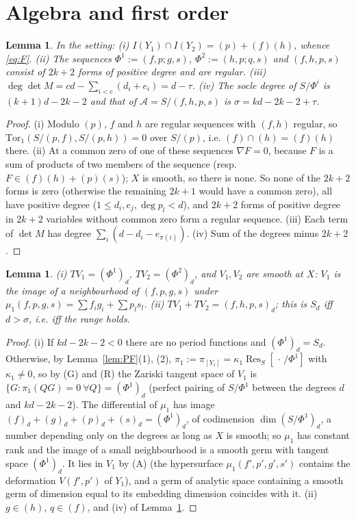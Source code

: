 \documentclass[11pt]{article}
\numberwithin{equation}{section}
\newtheorem{lemma}[theorem]{Lemma}
\theoremstyle{remark}
\newcommand{\cA}{\mathcal{A}}
\newcommand{\Res}{\operatorname{Res}}
\begin{document}
\section{Algebra and first order}\label{sec:first}

\begin{lemma}\label{lem:alg}
In the setting: (i) $I(Y_1)\cap I(Y_2)=(p)+(f)(h)$, whence \eqref{eq:F}. (ii) The sequences
$\Phi^1:=(f,p;g,s)$, $\Phi^2:=(h,p;q,s)$ and $(f,h,p,s)$ consist of $2k+2$ forms of positive degree and are
regular. (iii) $\deg\det M=cd-\sum_{i<c}(d_i+e_i)=d-\tau$. (iv) The socle degree of
$S/\Phi^i$ is $(k+1)d-2k-2$ and that of $\cA=S/(f,h,p,s)$ is $\sigma=kd-2k-2+\tau$.
\end{lemma}
\begin{proof}
(i) Modulo $(p)$, $f$ and $h$ are regular sequences with $(f,h)$ regular, so
$\mathrm{Tor}_1(S/(p,f),S/(p,h))=0$ over $S/(p)$, i.e. $(f)\cap(h)=(f)(h)$ there. (ii) At a common zero of one
of these sequences $\nabla F=0$, because $F$ is a sum of products of two members of the sequence (resp.
$F\in(f)(h)+(p)(s)$); $X$ is smooth, so there is none. So none of the $2k+2$ forms is zero (otherwise the
remaining $2k+1$ would have a common zero), all have positive degree ($1\le d_i,e_j,\deg p_l<d$), and $2k+2$
forms of positive degree in $2k+2$ variables without common zero form a regular sequence. (iii) Each term of
$\det M$ has degree $\sum_i(d-d_i-e_{\pi(i)})$. (iv) Sum of the degrees minus $2k+2$.
\end{proof}

\begin{lemma}\label{lem:T}
(i) $TV_1=(\Phi^1)_d$, $TV_2=(\Phi^2)_d$, and $V_1,V_2$ are smooth at $X$: $V_1$ is the image of a neighbourhood
of $(f,p,g,s)$ under $\mu_1(f,p,g,s)=\sum f_ig_i+\sum p_ls_l$. (ii) $TV_1+TV_2=(f,h,p,s)_d$; this is $S_d$ iff
$d>\sigma$, i.e. iff the range holds.
\end{lemma}
\begin{proof}
(i) If $kd-2k-2<0$ there are no period functions and $(\Phi^1)_d=S_d$. Otherwise, by Lemma~\ref{lem:PF}(1),
(2), $\pi_1:=\pi_{[Y_1]}=\kappa_1\Res_S[\,\cdot\,/\Phi^1]$ with $\kappa_1\ne0$, so by (G) and (R) the Zariski tangent space of
$V_1$ is $\{G:\pi_1(QG)=0\ \forall Q\}=(\Phi^1)_d$ (perfect pairing of $S/\Phi^1$ between the degrees $d$ and
$kd-2k-2$). The differential of $\mu_1$ has image
$(f)_d+(g)_d+(p)_d+(s)_d=(\Phi^1)_d$, of codimension $\dim(S/\Phi^1)_d$, a number depending only on the degrees
as long as $X$ is smooth; so $\mu_1$ has constant rank and the image of a small neighbourhood is a smooth germ
with tangent space $(\Phi^1)_d$. It lies in $V_1$ by (A) (the hypersurface $\mu_1(f',p',g',s')$ contains the
deformation $V(f',p')$ of $Y_1$), and a germ of analytic space containing a smooth germ of dimension equal to
its embedding dimension coincides with it. (ii) $g\in(h)$, $q\in(f)$, and (iv) of Lemma~\ref{lem:alg}.
\end{proof}
\end{document}
